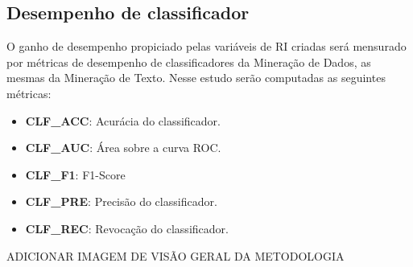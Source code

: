     \subsection{Desempenho de classificador}  \label{sec:Desempenho-de-classificador}
    O ganho de desempenho propiciado pelas variáveis de RI criadas será mensurado por métricas de desempenho de classificadores da Mineração de Dados, as mesmas da Mineração de Texto.
    Nesse estudo serão computadas as seguintes métricas:
    \begin{itemize}
        \item \textbf{CLF\_ACC}: Acurácia do classificador.
        \item \textbf{CLF\_AUC}: Área sobre a curva ROC.
        \item \textbf{CLF\_F1}: F1-Score
        \item \textbf{CLF\_PRE}: Precisão do classificador.
        \item \textbf{CLF\_REC}: Revocação do classificador.
    \end{itemize}


ADICIONAR IMAGEM DE VISÃO GERAL DA METODOLOGIA








% 

